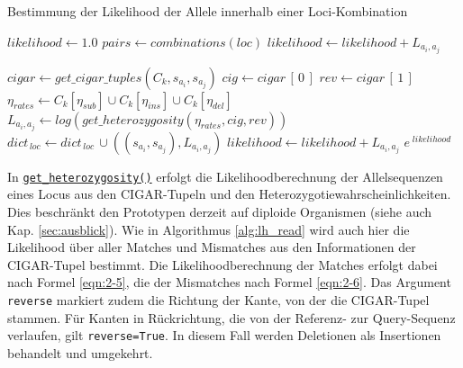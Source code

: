 \begin{algorithm}[H]
	\caption{Bestimmung der Likelihood der Allele innerhalb einer Loci-Kombination}  \label{alg:lh_loci}
	\begin{algorithmic}[1]	
		\State $ likelihood \gets 1.0 $
		    \State $ pairs \gets combinations(loc) $
		    \State $likelihood \gets likelihood + L_{a_{i}, a_{j}} $

		    \Else
		    
		    
		    
		    \State $cigar \gets get\_cigar\_tuples(C_{k}, s_{a_{i}}, s_{a_{j}})$  
			        \State $cig \gets cigar\,[\,0\,]$
			        \State $rev \gets cigar\,[\,1\,]$
			        \State $ \eta_{rates} \gets C_{k}[\eta_{sub}] \cup C_{k}[\eta_{ins}] \cup C_{k}[\eta_{del}]$
			        \State $L_{a_{i}, a_{j}} \gets log(get\_heterozygosity(\eta_{rates}, cig, rev))$  
			        \State $ dict_{\,loc} \gets dict_{\,loc} \, \cup ((s_{a_{i}}, s_{a_{j}}),  L_{a_{i}, a_{j}})  $
			    	\State $ likelihood \gets likelihood + L_{a_{i}, a_{j}}$    
			        \EndIf
			\EndIf
			\EndFor
		\EndFor
		\State \Return $ e^{\;likelihood} $
		\EndFunction
	\end{algorithmic}
\end{algorithm}

In \hyperref[schritt15]{\lstinline|get_heterozygosity()|\label{schritt15txt}} erfolgt die Likelihoodberechnung der Allelsequenzen eines Locus aus den CIGAR-Tupeln und den Heterozygotiewahrscheinlichkeiten. Dies beschränkt den Prototypen derzeit auf diploide Organismen (siehe auch Kap. \ref{sec:ausblick}). Wie in Algorithmus \ref{alg:lh_read} wird auch hier die Likelihood über aller Matches und Mismatches aus den Informationen der CIGAR-Tupel bestimmt. Die Likelihoodberechnung der Matches erfolgt dabei nach Formel \ref{eqn:2-5}, die der Mismatches nach Formel \ref{eqn:2-6}. Das Argument \lstinline|reverse| markiert zudem die Richtung der Kante, von der die CIGAR-Tupel stammen. Für  Kanten in Rückrichtung, die von der Referenz- zur Query-Sequenz verlaufen, gilt \lstinline|reverse=True|. In diesem Fall werden Deletionen als Insertionen behandelt und umgekehrt. \\

